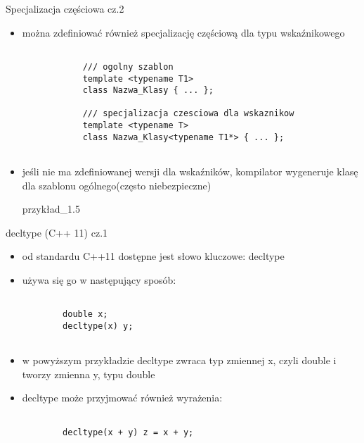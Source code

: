 \documentclass[11pt]{beamer}
\begin{document}
\begin{frame}[fragile]{Specjalizacja częściowa cz.2}
	\begin{itemize}
		\item można zdefiniować również specjalizację częściową dla typu wskaźnikowego
		\begin{lstlisting}[frame=single]  % Start your code-block
		
			/// ogolny szablon
			template <typename T1>
			class Nazwa_Klasy { ... };
			
			/// specjalizacja czesciowa dla wskaznikow
			template <typename T>
			class Nazwa_Klasy<typename T1*> { ... };
			
		\end{lstlisting}
		\item jeśli nie ma zdefiniowanej wersji dla wskaźników, kompilator wygeneruje klasę dla szablonu ogólnego(często niebezpieczne)
		
		\alert{przykład\_1.5}
	\end{itemize}

\end{frame}



\begin{frame}[fragile]{decltype (C++ 11) cz.1}
	\begin{itemize}
		\item od standardu C++11 dostępne jest słowo kluczowe: decltype
		\item używa się go w następujący sposób:
		
		\begin{lstlisting}[frame=single]  % Start your code-block
		
		double x;
		decltype(x) y;
			
		\end{lstlisting}
		\item w powyższym przykładzie decltype zwraca typ zmiennej x, czyli double i tworzy zmienna y, typu double
		\item decltype może przyjmować również wyrażenia:
		
		
		\begin{lstlisting}[frame=single]  % Start your code-block
		
		decltype(x + y) z = x + y;
			
		\end{lstlisting}
		
	\end{itemize}

\end{frame}
\end{document}
